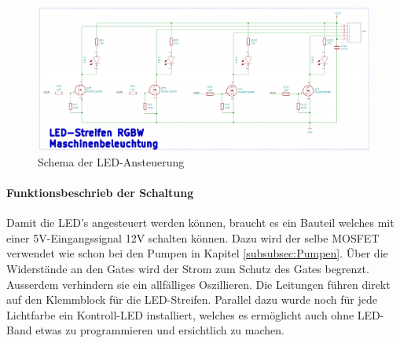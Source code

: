 \begin{figure}[H]
\center
\includegraphics[width =  \textwidth]{graphics/Schema_LED}
\caption{Schema der LED-Ansteuerung}
\label{fig:Schema_LED}
\end{figure}

\paragraph{Funktionsbeschrieb der Schaltung}\mbox{}

Damit die LED's angesteuert werden können, braucht es ein Bauteil welches mit einer 5V-Eingangssignal 12V schalten können. Dazu wird der selbe MOSFET verwendet wie schon bei den Pumpen in Kapitel \ref{subsubsec:Pumpen}. Über die Widerstände an den Gates wird der Strom zum Schutz des Gates begrenzt. Ausserdem verhindern sie ein allfälliges Oszillieren. Die Leitungen führen direkt auf den Klemmblock für die LED-Streifen. Parallel dazu wurde noch für jede Lichtfarbe ein Kontroll-LED installiert, welches es ermöglicht auch ohne LED-Band etwas zu programmieren und ersichtlich zu machen.